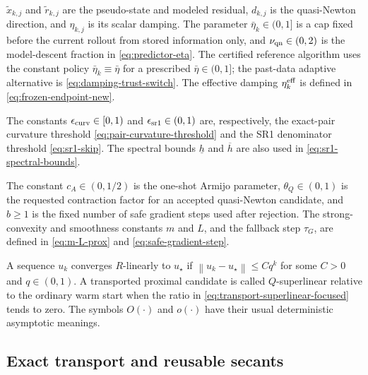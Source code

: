 \documentclass[10pt,leqno]{amsart}
\numberwithin{equation}{section}
\numberwithin{algorithm}{section}
\theoremstyle{remark}
\newcommand{\norm}[1]{\left\lVert #1 \right\rVert}
\begin{document}
\begin{description}[style=nextline,leftmargin=2.8em,labelindent=0em]
\item[Predictor variables and damping.]
$\widetilde x_{k,j}$ and $\widetilde r_{k,j}$ are the pseudo-state and modeled residual, $d_{k,j}$ is the quasi-Newton direction, and $\eta_{k,j}$ is its scalar damping.  The parameter $\bar\eta_k\in(0,1]$ is a cap fixed before the current rollout from stored information only, and $\nu_{\rm qn}\in(0,2)$ is the model-descent fraction in \eqref{eq:predictor-eta}.  The certified reference algorithm uses the constant policy $\bar\eta_k\equiv\bar\eta$ for a prescribed $\bar\eta\in(0,1]$; the past-data adaptive alternative is \eqref{eq:damping-trust-switch}.  The effective damping $\eta_k^{\rm eff}$ is defined in \eqref{eq:frozen-endpoint-new}.

\item[Pair and model safeguards.]
The constants $\epsilon_{\rm curv}\in[0,1)$ and $\epsilon_{\rm sr1}\in(0,1)$ are, respectively, the exact-pair curvature threshold \eqref{eq:pair-curvature-threshold} and the SR1 denominator threshold \eqref{eq:sr1-skip}.  The spectral bounds $\underline h$ and $\overline h$ are also used in \eqref{eq:sr1-spectral-bounds}.

\item[Certified inner call.]
The constant $c_A\in(0,1/2)$ is the one-shot Armijo parameter, $\theta_Q\in(0,1)$ is the requested contraction factor for an accepted quasi-Newton candidate, and $b\ge1$ is the fixed number of safe gradient steps used after rejection.  The strong-convexity and smoothness constants $m$ and $L$, and the fallback step $\tau_G$, are defined in \eqref{eq:m-L-prox} and \eqref{eq:safe-gradient-step}.

\item[Convergence terminology.]
A sequence $u_k$ converges $R$-linearly to $u_\star$ if $\norm{u_k-u_\star}\le Cq^k$ for some $C>0$ and $q\in(0,1)$.  A transported proximal candidate is called $Q$-superlinear relative to the ordinary warm start when the ratio in \eqref{eq:transport-superlinear-focused} tends to zero.  The symbols $O(\cdot)$ and $o(\cdot)$ have their usual deterministic asymptotic meanings.
\end{description}

\subsection{Exact transport and reusable secants}
\label{sec:transport-secant}
\end{document}
